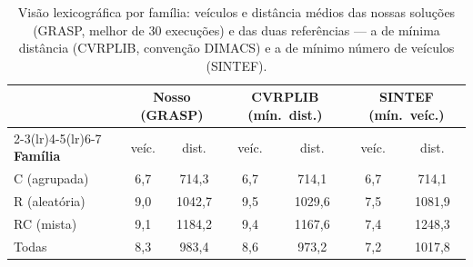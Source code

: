 \begin{table}[H]
\centering
\caption{Visão lexicográfica por família: veículos e distância médios das nossas soluções (GRASP, melhor de 30 execuções) e das duas referências --- a de mínima distância (CVRPLIB, convenção DIMACS) e a de mínimo número de veículos (SINTEF).}\label{tab:lex}
\begin{tabular}{lcccccc}
\toprule
& \multicolumn{2}{c}{\textbf{Nosso (GRASP)}} & \multicolumn{2}{c}{\textbf{CVRPLIB (mín.\ dist.)}} & \multicolumn{2}{c}{\textbf{SINTEF (mín.\ veíc.)}} \\
\cmidrule(lr){2-3}\cmidrule(lr){4-5}\cmidrule(lr){6-7}
\textbf{Família} & veíc. & dist. & veíc. & dist. & veíc. & dist. \\
\midrule
C (agrupada) & 6{,}7 & 714{,}3 & 6{,}7 & 714{,}1 & 6{,}7 & 714{,}1 \\
R (aleatória) & 9{,}0 & 1042{,}7 & 9{,}5 & 1029{,}6 & 7{,}5 & 1081{,}9 \\
RC (mista) & 9{,}1 & 1184{,}2 & 9{,}4 & 1167{,}6 & 7{,}4 & 1248{,}3 \\
\midrule
Todas & 8{,}3 & 983{,}4 & 8{,}6 & 973{,}2 & 7{,}2 & 1017{,}8 \\
\bottomrule
\end{tabular}
\end{table}
